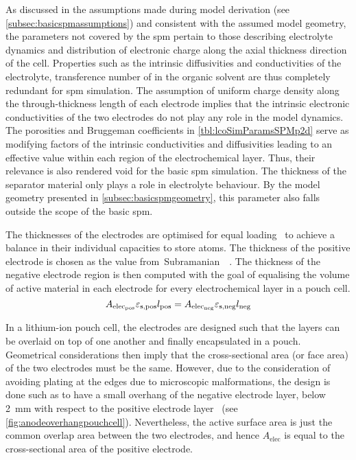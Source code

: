 As   discussed  in   the   assumptions  made   during   model  derivation   (see
\cref{subsec:basicspmassumptions})  and   consistent  with  the   assumed  model
geometry,  the  parameters  not  covered  by  the  \gls{spm}  pertain  to  those
describing electrolyte dynamics and distribution  of electronic charge along the
axial  thickness  direction  of  the  cell. Properties  such  as  the  intrinsic
diffusivities  and conductivities  of  the electrolyte,  transference number  of
 in  the organic  solvent are thus  completely redundant  for \gls{spm}
simulation. The assumption of uniform charge density along the through-thickness
length of each electrode implies that the intrinsic electronic conductivities of
the two electrodes  do not play any  role in the model  dynamics. The porosities
and Bruggeman  coefficients in \cref{tbl:lcoSimParamsSPMp2d} serve  as modifying
factors  of  the  intrinsic  conductivities  and  diffusivities  leading  to  an
effective value  within each  region of the  electrochemical layer.  Thus, their
relevance  is  also  rendered  void  for the  basic  \gls{spm}  simulation.  The
thickness of the separator material only  plays a role in electrolyte behaviour.
By  the   model  geometry  presented  in   \cref{subsec:basicspmgeometry},  this
parameter also falls outside the scope of the basic \gls{spm}.

The  thicknesses  of the  electrodes  are  optimised  for equal  loading  \ie~to
achieve   a  balance   in   their  individual   capacities   to  store   
atoms.  The  thickness  of  the  positive  electrode  is  chosen  as  the  value
from~Subramanian~\etal{}~\cite{Subramanian2009}. The  thickness of  the negative
electrode region  is then  computed with  the goal of  equalising the  volume of
active material  in each electrode  for every  electrochemical layer in  a pouch
cell.
\begin{equation}\label{eq:basiccapacitybalance}
    A_{\text{elec}_\text{pos}}\varepsilon_{\text{s,pos}} l_\text{pos} = A_{\text{elec}_\text{neg}}\varepsilon_{\text{s,neg}} l_\text{neg}
\end{equation}

In a  lithium-ion pouch cell, the  electrodes are designed such  that the layers
can be  overlaid on  top of  one another  and finally  encapsulated in  a pouch.
Geometrical considerations  then imply  that the  cross-sectional area  (or face
area) of the two electrodes must be  the same. However, due to the consideration
of  avoiding  plating  at  the  edges  due  to  microscopic  malformations,  the
design  is done  such as  to have  a small  overhang of  the negative  electrode
layer,  below  \SI{2}{\milli\meter}  with  respect  to  the  positive  electrode
layer~\cite{Bond2017} (see \cref{fig:anodeoverhangpouchcell}). Nevertheless, the
active surface area is just the  common overlap area between the two electrodes,
and hence $A_\text{elec}$  is equal to the cross-sectional area  of the positive
electrode.

